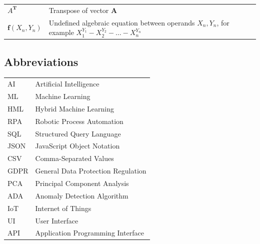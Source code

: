 \documentclass[english, 12pt, a4paper, elec, utf8, a-1b, online]{aaltothesis}
\begin{document}
\begin{tabularx}{\textwidth}{l X}
  $A^{\mathbf{T}}$    & Transpose of vector $\mathbf{A}$ \\
  $\mathbf{f}(X_{n},Y_{n})$    & Undefined algebraic equation between operands $X_{n},Y_{n}$,
  for example $X_{1}^{Y_{1}}-X_{2}^{Y_{2}}-\ldots-X_{n}^{Y_{n}}$
\end{tabularx}

\subsection*{Abbreviations}

\begin{tabular}{ll}
  AI          & Artificial Intelligence \\
  ML          & Machine Learning \\
  HML         & Hybrid Machine Learning \\
  RPA         & Robotic Process Automation \\
  SQL         & Structured Query Language \\
  JSON        & JavaScript Object Notation \\
  CSV         & Comma-Separated Values \\
  GDPR        & General Data Protection Regulation \\
  PCA         & Principal Component Analysis \\
  ADA         & Anomaly Detection Algorithm \\
  IoT         & Internet of Things \\
  UI          & User Interface \\
  API         & Application Programming Interface
\end{tabular}


\cleardoublepage











\thesisbibliography





\end{document}
